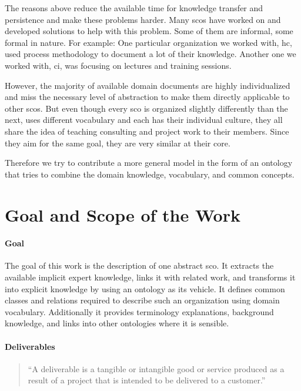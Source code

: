 \documentclass[a4paper, DIV=13, BCOR=0cm]{scrbook}
\begin{document}
The reasons above reduce the available time for knowledge transfer and persistence and make these problems harder. Many \glspl{sco} have worked on and developed solutions to help with this problem. Some of them are informal, some formal in nature. For example: One particular organization we worked with, \gls{hc}, used process methodology to document a lot of their knowledge. Another one we worked with, \gls{ci}, was focusing on lectures and training sessions.

However, the majority of available domain documents are highly individualized and miss the necessary level of abstraction to make them directly applicable to other \glspl{sco}. But even though every \gls{sco} is organized slightly differently than the next, uses different vocabulary and each has their individual culture, they all share the idea of teaching consulting and project work to their members. Since they aim for the same goal, they are very similar at their core.

Therefore we try to contribute a more general model in the form of an ontology that tries to combine the domain knowledge, vocabulary, and common concepts.

\section{Goal and Scope of the Work }
\label{goal}
\paragraph{Goal}
The goal of this work is the description of one abstract \gls{sco}. It extracts the available implicit expert knowledge, links it with related work, and transforms it into explicit  knowledge by using an ontology as its vehicle. It defines common classes and relations required to describe such an organization using domain vocabulary. Additionally it provides terminology explanations, background knowledge, and links into other ontologies where it is sensible.

\paragraph{Deliverables}
\begin{quote}
	\enquote{A deliverable is a tangible or intangible good or service produced as a result of a project that is intended to be delivered to a customer.} \cite{deliverable}
\end{quote}
\end{document}

